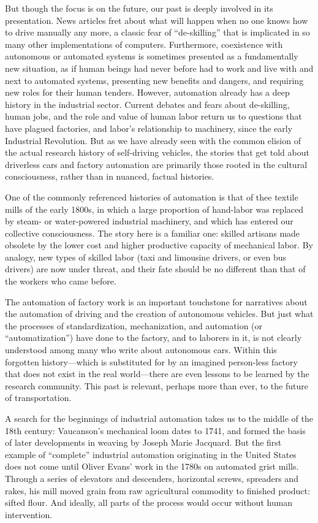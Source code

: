 But though the focus is on the future, our past is deeply involved
in its presentation. News articles fret
about what will happen when no one knows how to drive manually any
more,\cite{pross} a classic fear of ``de-skilling'' that is implicated in so many
other implementations of computers. Furthermore, coexistence with
autonomous or automated systems is sometimes presented as a fundamentally new
situation, as if human beings had never before had to work and live
with and next to automated systems, presenting new benefits and
dangers, and requiring new roles for their human tenders. However,
automation already has a deep 
history in the industrial sector. Current debates and fears about de-skilling, human jobs,
and the role and value of human labor return us to questions that have
plagued factories, and labor's relationship to machinery, since the
early Industrial Revolution. But as we have already seen with the common
elision of the actual research history of self-driving vehicles, the
stories that get told about driverless cars and factory automation are
primarily those rooted in the cultural consciousness, rather than in
nuanced, factual histories.

One of the commonly referenced histories of automation is that of thee
textile mills of the early 1800s, in which a large
proportion of hand-labor was replaced by steam- or
water-powered industrial machinery, and which has entered our collective
consciousness. The
story here is a familiar one: skilled artisans made obsolete by the
lower cost and higher productive capacity of mechanical labor.\cite{pewPositive} By
analogy, new types of skilled labor (taxi and limousine drivers, or
even bus drivers) are now under threat, and their fate should be no
different than that of the workers who came before.

The automation of factory work is an
important touchstone for narratives about the automation of driving
and the creation of autonomous vehicles. But just what the
processes of standardization, mechanization, and automation (or
``automatization'') have done to the factory, and to laborers in it, is
not clearly understood among many who write about autonomous cars. Within this
forgotten history---which is substituted for by an imagined person-less
factory that does not exist in the real world---there are even lessons to be
learned by the research community. This past is relevant, perhaps
more than ever, to the future of transportation.

A search for the beginnings of industrial automation takes us to the middle of
the 18th century: Vaucanson's mechanical loom dates to 1741, and formed the basis of
 later developments in weaving by Joseph Marie Jacquard.\cite[p. 9]{dieboldImpact} 
But the first example of ``complete'' industrial automation originating in the
United States does not come until Oliver Evans' work in the 1780s on
automated grist mills.\cite[p. 5]{roesmithYankee} Through a series of elevators and descenders,
horizontal screws, spreaders and rakes, his mill moved grain from raw
agricultural commodity to finished product: sifted flour. And ideally,
all parts of the process would occur without human intervention. 

